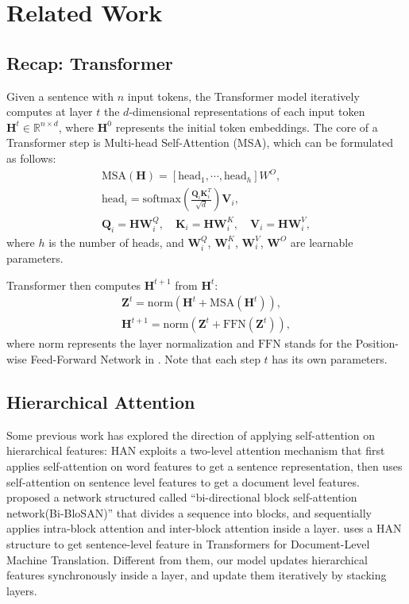 \documentclass[11pt,a4paper]{article}
\begin{document}
\section{Related Work}


\subsection{Recap: Transformer}
Given a sentence with $n$ input tokens, the Transformer model iteratively computes at layer $t$ the $d$-dimensional representations of each input token $\mathbf{H}^t \in \mathbb{R}^{n \times d}$, where $\mathbf{H}^0$ represents the initial token embeddings.
The core of a Transformer step is Multi-head Self-Attention (MSA), which can be formulated as follows:
\begin{equation}
\begin{gathered}
    \text{MSA}(\mathbf{H}) = [\text{head}_1,\cdots,\text{head}_h] W^O, \\ \text{head}_i = \text{softmax}\left(\frac{\mathbf{Q}_i \mathbf{K}_i^T}{\sqrt{d}}\right)\mathbf{V}_i, \\
    \mathbf{Q}_i = \mathbf{H} \mathbf{W}_i^Q, \quad \mathbf{K}_i = \mathbf{H} \mathbf{W}_i^K, \quad \mathbf{V}_i = \mathbf{H} \mathbf{W}_i^V, \end{gathered}
\end{equation}
where $h$ is the number of heads, and $\mathbf{W}_i^Q$, $\mathbf{W}_i^K$, $\mathbf{W}_i^V$, $\mathbf{W}^O$ are learnable parameters.

Transformer then computes $\mathbf{H}^{t+1}$ from $\mathbf{H}^t$:
\begin{align}
    \mathbf{Z}^t = \text{norm}(\mathbf{H}^t + \text{MSA}(\mathbf{H}^t)), \\
     \mathbf{H}^{t+1} = \text{norm}(\mathbf{Z}^t + \text{FFN}(\mathbf{Z}^t)),
\end{align}
where $\text{norm}$ represents the layer normalization \citep{ba2016layer} and $\text{FFN}$ stands for the Position-wise Feed-Forward Network in \citep{vaswani2017attention}.
Note that each step $t$ has its own parameters.

\subsection{Hierarchical Attention}

Some previous work has explored the direction of applying self-attention on hierarchical features: HAN \citep{yang2016hierarchical} exploits a two-level attention mechanism that first applies self-attention on word features to get a sentence representation, then uses self-attention on sentence level features to get a document level features. \citet{shen2018bi} proposed a network structured called ``bi-directional block self-attention network(Bi-BloSAN)'' that divides a sequence into blocks, and sequentially applies intra-block attention and inter-block attention inside a layer. \citet{miculicich-etal-2018-document} uses a HAN structure to get sentence-level feature in Transformers for Document-Level Machine Translation. Different from them, our model updates hierarchical features synchronously inside a layer, and update them iteratively by stacking layers.
\end{document}
